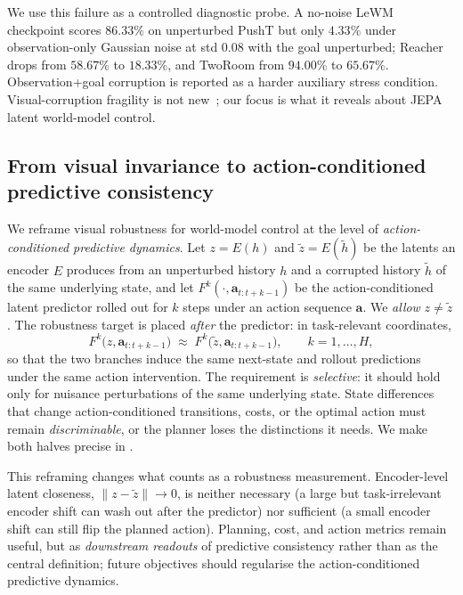\documentclass[10pt]{article}
\begin{document}
We use this failure as a controlled diagnostic probe. A no-noise LeWM~\cite{maes2026lewm} checkpoint scores $86.33\%$ on unperturbed PushT but only $4.33\%$ under observation-only Gaussian noise at std $0.08$ with the goal unperturbed; Reacher drops from $58.67\%$ to $18.33\%$, and TwoRoom from $94.00\%$ to $65.67\%$. Observation+goal corruption is reported as a harder auxiliary stress condition. Visual-corruption fragility is not new~\cite{kostrikov2020drq,yarats2022drqv2,hansen2021soda,vigmo}; our focus is what it reveals about JEPA latent world-model control.

\subsection{From visual invariance to action-conditioned predictive consistency}\label{sec:intro-acpc}

We reframe visual robustness for world-model control at the level of \emph{action-conditioned predictive dynamics}. Let $z = E(h)$ and $\tilde z = E(\tilde h)$ be the latents an encoder $E$ produces from an unperturbed history $h$ and a corrupted history $\tilde h$ of the same underlying state, and let $F^{k}(\cdot,\mathbf a_{t:t+k-1})$ be the action-conditioned latent predictor rolled out for $k$ steps under an action sequence $\mathbf a$. We \emph{allow} $z \neq \tilde z$. The robustness target is placed \emph{after} the predictor: in task-relevant coordinates,
\begin{equation}
  F^{k}\!\big(z,\mathbf a_{t:t+k-1}\big) \;\approx\; F^{k}\!\big(\tilde z,\mathbf a_{t:t+k-1}\big), \qquad k = 1,\dots,H,
  \label{eq:intro-acpc}
\end{equation}
so that the two branches induce the same next-state and rollout predictions under the same action intervention. The requirement is \emph{selective}: it should hold only for nuisance perturbations of the same underlying state. State differences that change action-conditioned transitions, costs, or the optimal action must remain \emph{discriminable}, or the planner loses the distinctions it needs. We make both halves precise in .

This reframing changes what counts as a robustness measurement. Encoder-level latent closeness, $\lVert z-\tilde z\rVert \to 0$, is neither necessary (a large but task-irrelevant encoder shift can wash out after the predictor) nor sufficient (a small encoder shift can still flip the planned action). Planning, cost, and action metrics remain useful, but as \emph{downstream readouts} of predictive consistency rather than as the central definition; future objectives should regularise the action-conditioned predictive dynamics.
\end{document}
